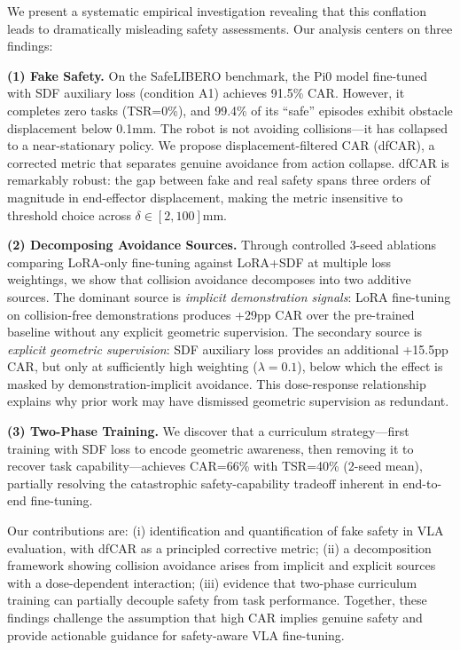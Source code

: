 \documentclass[letterpaper]{article}
\begin{document}
We present a systematic empirical investigation revealing that this conflation leads to dramatically misleading safety assessments. Our analysis centers on three findings:

\textbf{(1) Fake Safety.}  On the SafeLIBERO benchmark, the Pi0 model fine-tuned with SDF auxiliary loss (condition A1) achieves 91.5\% CAR. However, it completes zero tasks (TSR=0\%), and 99.4\% of its ``safe'' episodes exhibit obstacle displacement below 0.1mm. The robot is not avoiding collisions---it has collapsed to a near-stationary policy. We propose displacement-filtered CAR (dfCAR), a corrected metric that separates genuine avoidance from action collapse. dfCAR is remarkably robust: the gap between fake and real safety spans three orders of magnitude in end-effector displacement, making the metric insensitive to threshold choice across $\delta \in [2, 100]$mm.

\textbf{(2) Decomposing Avoidance Sources.} Through controlled 3-seed ablations comparing LoRA-only fine-tuning against LoRA+SDF at multiple loss weightings, we show that collision avoidance decomposes into two additive sources. The dominant source is \emph{implicit demonstration signals}: LoRA fine-tuning on collision-free demonstrations produces +29pp CAR over the pre-trained baseline without any explicit geometric supervision. The secondary source is \emph{explicit geometric supervision}: SDF auxiliary loss provides an additional +15.5pp CAR, but only at sufficiently high weighting ($\lambda=0.1$), below which the effect is masked by demonstration-implicit avoidance. This dose-response relationship explains why prior work may have dismissed geometric supervision as redundant.

\textbf{(3) Two-Phase Training.} We discover that a curriculum strategy---first training with SDF loss to encode geometric awareness, then removing it to recover task capability---achieves CAR=66\% with TSR=40\% (2-seed mean), partially resolving the catastrophic safety-capability tradeoff inherent in end-to-end fine-tuning.

Our contributions are: (i) identification and quantification of fake safety in VLA evaluation, with dfCAR as a principled corrective metric; (ii) a decomposition framework showing collision avoidance arises from implicit and explicit sources with a dose-dependent interaction; (iii) evidence that two-phase curriculum training can partially decouple safety from task performance. Together, these findings challenge the assumption that high CAR implies genuine safety and provide actionable guidance for safety-aware VLA fine-tuning.
\end{document}
